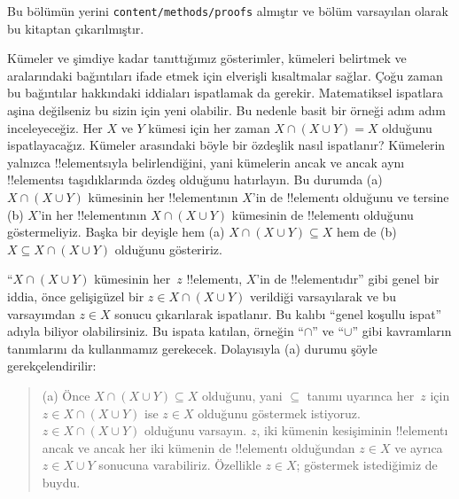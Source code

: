 


\begin{editorial}
Bu bölümün yerini \verb|content/methods/proofs| almıştır ve bölüm varsayılan
olarak bu kitaptan çıkarılmıştır.
\end{editorial}

\begin{explain}
Kümeler ve şimdiye kadar tanıttığımız gösterimler, kümeleri belirtmek ve
aralarındaki bağıntıları ifade etmek için elverişli kısaltmalar sağlar. Çoğu
zaman bu bağıntılar hakkındaki iddiaları ispatlamak da gerekir. Matematiksel
ispatlara aşina değilseniz bu sizin için yeni olabilir. Bu nedenle basit bir
örneği adım adım inceleyeceğiz. Her $X$ ve $Y$ kümesi için her zaman
$X \cap (X \cup Y) = X$ olduğunu ispatlayacağız. Kümeler arasındaki böyle bir
özdeşlik nasıl ispatlanır? Kümelerin yalnızca !!{element}s{}ıyla belirlendiğini,
yani kümelerin ancak ve ancak aynı !!{element}s{}ı taşıdıklarında özdeş olduğunu
hatırlayın. Bu durumda (a) $X \cap (X \cup Y)$ kümesinin her !!{element}{}ının
$X$'in de !!{element}{}ı olduğunu ve tersine (b) $X$'in her !!{element}{}ının
$X \cap (X \cup Y)$ kümesinin de !!{element}{}ı olduğunu göstermeliyiz. Başka
bir deyişle hem (a) $X \cap (X \cup Y) \subseteq X$ hem de
(b) $X \subseteq X \cap (X \cup Y)$ olduğunu gösteririz.

``$X \cap (X \cup Y)$ kümesinin her~$z$ !!{element}{}ı, $X$'in de
!!{element}{}ıdır'' gibi genel bir iddia, önce gelişigüzel bir
$z \in X \cap (X \cup Y)$ verildiği varsayılarak ve bu varsayımdan
$z \in X$ sonucu çıkarılarak ispatlanır. Bu kalıbı ``genel koşullu ispat''
adıyla biliyor olabilirsiniz. Bu ispata katılan, örneğin ``$\cap$'' ve
``$\cup$'' gibi kavramların tanımlarını da kullanmamız gerekecek. Dolayısıyla
(a) durumu şöyle gerekçelendirilir:

\begin{quote}
(a) Önce $X \cap (X \cup Y) \subseteq X$ olduğunu, yani $\subseteq$ tanımı
uyarınca her~$z$ için $z \in X \cap (X \cup Y)$ ise $z \in X$ olduğunu
göstermek istiyoruz. $z \in X \cap (X \cup Y)$ olduğunu varsayın. $z$, iki
kümenin kesişiminin !!{element}{}ı ancak ve ancak her iki kümenin de
!!{element}{}ı olduğundan $z \in X$ ve ayrıca $z \in X \cup Y$ sonucuna
varabiliriz. Özellikle $z \in X$; göstermek istediğimiz de buydu.
\end{quote}


\end{explain}
